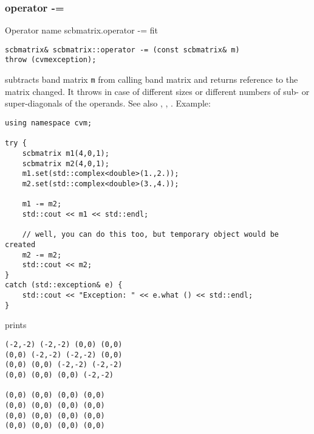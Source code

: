 \subsubsection{operator -=}
Operator%
\pdfdest name {scbmatrix.operator -=} fit
\begin{verbatim}
scbmatrix& scbmatrix::operator -= (const scbmatrix& m) 
throw (cvmexception);
\end{verbatim}
subtracts  band matrix \verb"m" from  calling band matrix
and returns  reference to
the matrix changed.
It throws  
in case of different sizes or different numbers of sub- or super-diagonals
of the operands.
See also ,
,
.
Example:
\begin{Verbatim}
using namespace cvm;

try {
    scbmatrix m1(4,0,1);
    scbmatrix m2(4,0,1);
    m1.set(std::complex<double>(1.,2.));
    m2.set(std::complex<double>(3.,4.));

    m1 -= m2;
    std::cout << m1 << std::endl;

    // well, you can do this too, but temporary object would be created
    m2 -= m2; 
    std::cout << m2;
}
catch (std::exception& e) {
    std::cout << "Exception: " << e.what () << std::endl;
}
\end{Verbatim}
prints
\begin{Verbatim}
(-2,-2) (-2,-2) (0,0) (0,0)
(0,0) (-2,-2) (-2,-2) (0,0)
(0,0) (0,0) (-2,-2) (-2,-2)
(0,0) (0,0) (0,0) (-2,-2)

(0,0) (0,0) (0,0) (0,0)
(0,0) (0,0) (0,0) (0,0)
(0,0) (0,0) (0,0) (0,0)
(0,0) (0,0) (0,0) (0,0)
\end{Verbatim}
\newpage



